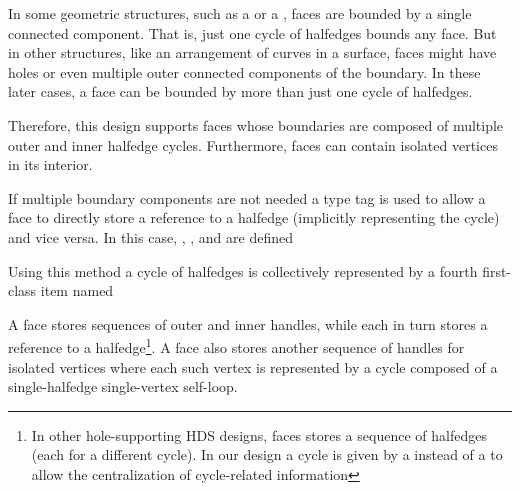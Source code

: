 
{\XHDS
In some geometric structures, such as a  or a ,
faces are bounded by a single connected component. That is, just one cycle of halfedges bounds
any face. But in other structures, like an arrangement of curves in a surface, faces
might have holes or even multiple outer connected components of the boundary. 
In these later cases, a face can be bounded by more than just one cycle of halfedges. 

Therefore, this design supports faces
whose boundaries are composed of multiple outer and inner halfedge cycles. Furthermore, faces can contain isolated vertices in its interior.




If multiple boundary components are not needed a type tag is used to allow a face to directly store 
a reference to a halfedge (implicitly representing the cycle) and vice versa. In this case, , ,  
and  are defined


Using this method a cycle of halfedges is collectively represented 
by a fourth first-class  item named  

A face stores sequences of outer and inner  handles, while each 
 in turn stores a reference to a halfedge\footnote{In other
hole-supporting HDS designs, faces stores a sequence of halfedges (each for a different cycle).
In our design a cycle is given by a  instead of a  to allow 
the centralization of cycle-related information}. 
A face also stores another sequence of  handles for isolated vertices where
each such vertex is represented by a cycle composed of a single-halfedge single-vertex self-loop.

}
